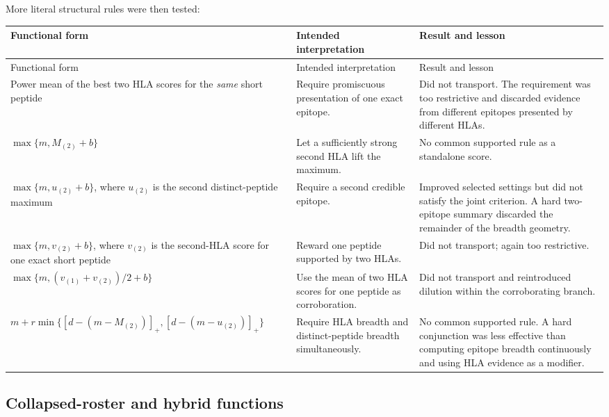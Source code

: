 \documentclass[11pt]{article}
\begin{document}
More literal structural rules were then tested:
\begin{longtable}{@{}p{}p{}p{}@{}}
\toprule
Functional form & Intended interpretation & Result and lesson \\
\midrule
\endfirsthead
\toprule
Functional form & Intended interpretation & Result and lesson \\
\midrule
\endhead
Power mean of the best two HLA scores for the \emph{same} short peptide
& Require promiscuous presentation of one exact epitope.
& Did not transport. The requirement was too restrictive and discarded
evidence from different epitopes presented by different HLAs. \\
\addlinespace
$\max\{m,M_{(2)}+b\}$
& Let a sufficiently strong second HLA lift the maximum.
& No common supported rule as a standalone score. \\
\addlinespace
$\max\{m,u_{(2)}+b\}$, where $u_{(2)}$ is the second distinct-peptide maximum
& Require a second credible epitope.
& Improved selected settings but did not satisfy the joint criterion. A hard
two-epitope summary discarded the remainder of the breadth geometry. \\
\addlinespace
$\max\{m,v_{(2)}+b\}$, where $v_{(2)}$ is the second-HLA score for one exact
short peptide
& Reward one peptide supported by two HLAs.
& Did not transport; again too restrictive. \\
\addlinespace
$\max\{m,(v_{(1)}+v_{(2)})/2+b\}$
& Use the mean of two HLA scores for one peptide as corroboration.
& Did not transport and reintroduced dilution within the corroborating branch. \\
\addlinespace
$m+r\min\{[d-(m-M_{(2)})]_+,[d-(m-u_{(2)})]_+\}$
& Require HLA breadth and distinct-peptide breadth simultaneously.
& No common supported rule. A hard conjunction was less effective than
computing epitope breadth continuously and using HLA evidence as a modifier. \\
\bottomrule
\end{longtable}

\subsection{Collapsed-roster and hybrid functions}
\end{document}
